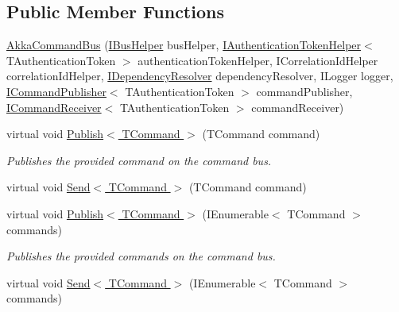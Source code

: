 \subsection*{Public Member Functions}
\begin{DoxyCompactItemize}
\item 
\hyperlink{classCqrs_1_1Akka_1_1Commands_1_1AkkaCommandBus_a255b78be5cb216dcd30e2d2dd1240c06_a255b78be5cb216dcd30e2d2dd1240c06}{Akka\+Command\+Bus} (\hyperlink{interfaceCqrs_1_1Bus_1_1IBusHelper}{I\+Bus\+Helper} bus\+Helper, \hyperlink{interfaceCqrs_1_1Authentication_1_1IAuthenticationTokenHelper}{I\+Authentication\+Token\+Helper}$<$ T\+Authentication\+Token $>$ authentication\+Token\+Helper, I\+Correlation\+Id\+Helper correlation\+Id\+Helper, \hyperlink{interfaceCqrs_1_1Configuration_1_1IDependencyResolver}{I\+Dependency\+Resolver} dependency\+Resolver, I\+Logger logger, \hyperlink{interfaceCqrs_1_1Commands_1_1ICommandPublisher}{I\+Command\+Publisher}$<$ T\+Authentication\+Token $>$ command\+Publisher, \hyperlink{interfaceCqrs_1_1Commands_1_1ICommandReceiver}{I\+Command\+Receiver}$<$ T\+Authentication\+Token $>$ command\+Receiver)
\item 
virtual void \hyperlink{classCqrs_1_1Akka_1_1Commands_1_1AkkaCommandBus_a48e1d46035b1e1a3251636b8a03f7dae_a48e1d46035b1e1a3251636b8a03f7dae}{Publish$<$ T\+Command $>$} (T\+Command command)
\begin{DoxyCompactList}\small\item\em Publishes the provided {\itshape command}  on the command bus. \end{DoxyCompactList}\item 
virtual void \hyperlink{classCqrs_1_1Akka_1_1Commands_1_1AkkaCommandBus_a696f471533265685f80922e39727288e_a696f471533265685f80922e39727288e}{Send$<$ T\+Command $>$} (T\+Command command)
\item 
virtual void \hyperlink{classCqrs_1_1Akka_1_1Commands_1_1AkkaCommandBus_ab52365375febd74ac078e97af6e6cd24_ab52365375febd74ac078e97af6e6cd24}{Publish$<$ T\+Command $>$} (I\+Enumerable$<$ T\+Command $>$ commands)
\begin{DoxyCompactList}\small\item\em Publishes the provided {\itshape commands}  on the command bus. \end{DoxyCompactList}\item 
virtual void \hyperlink{classCqrs_1_1Akka_1_1Commands_1_1AkkaCommandBus_a06b7b148493c67d79aaf6b7d59afa487_a06b7b148493c67d79aaf6b7d59afa487}{Send$<$ T\+Command $>$} (I\+Enumerable$<$ T\+Command $>$ commands)

\end{DoxyCompactItemize}
